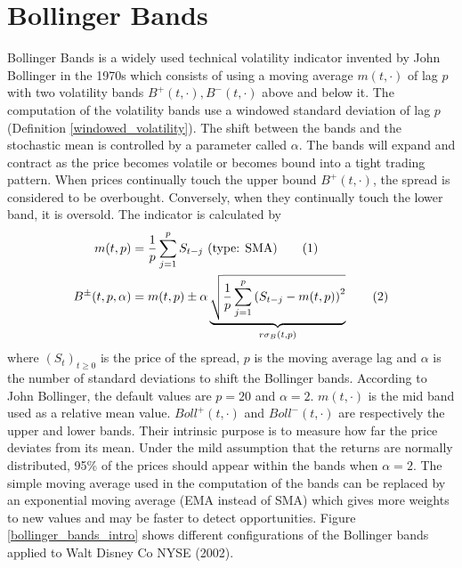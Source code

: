 \documentclass[11pt,a4,twosided,singlespacing,titlepagenumber=on]{scrreprt}
\numberwithin{equation}{chapter} %
\theoremstyle{remark}
\newcommand\numberthis{\addtocounter{equation}{1}\tag{\theequation}}
\begin{document}
\section{Bollinger Bands}
\label{sec:bollinger_bands}
Bollinger Bands is a widely used technical volatility indicator invented by John Bollinger in the 1970s which consists of using a moving average $m(t,\cdot)$ of lag $p$ with two volatility bands $B^+(t,\cdot), B^-(t,\cdot)$ above and below it. The computation of the volatility bands use a windowed standard deviation of lag $p$ (Definition \ref{windowed_volatility}). The shift between the bands and the stochastic mean is controlled by a parameter called $\alpha$. The bands will expand and contract as the price becomes volatile or becomes bound into a tight trading pattern. When prices continually touch the upper bound $B^+(t,\cdot)$, the spread is considered to be overbought. Conversely, when they continually touch the lower band, it is oversold. The indicator is calculated by
\begin{align*}
m(t,p) &= \frac{1}{p}\sum_{j=1}^p S_{t-j} \text{ (type: SMA)} \numberthis \\
B^\pm(t,p,\alpha) &= m(t,p) \pm \alpha \underbrace{\sqrt{\frac{1}{p} \sum_{j=1}^p \left(S_{t-j} - m(t,p) \right)^2}}_{r\sigma_B(t,p)} \numberthis \label{bolls_computations}
\end{align*}
where $(S_t)_{t \geq 0}$ is the price of the spread, $p$ is the moving average lag and $\alpha$ is the number of standard deviations to shift the Bollinger bands. According to John Bollinger, the default values are $p = 20$ and $\alpha = 2$. $m(t,\cdot)$ is the mid band used as a relative mean value. $Boll^+(t,\cdot)$ and $Boll^-(t,\cdot)$ are respectively the upper and lower bands. Their intrinsic purpose is to measure how far the price deviates from its mean. Under the mild assumption that the returns are normally distributed, 95\% of the prices should appear within the bands when $\alpha = 2$. The simple moving average used in the computation of the bands can be replaced by an exponential moving average (EMA instead of SMA) which gives more weights to new values and may be faster to detect opportunities. Figure \ref{bollinger_bands_intro} shows different configurations of the Bollinger bands applied to Walt Disney Co NYSE (2002).
\end{document}
